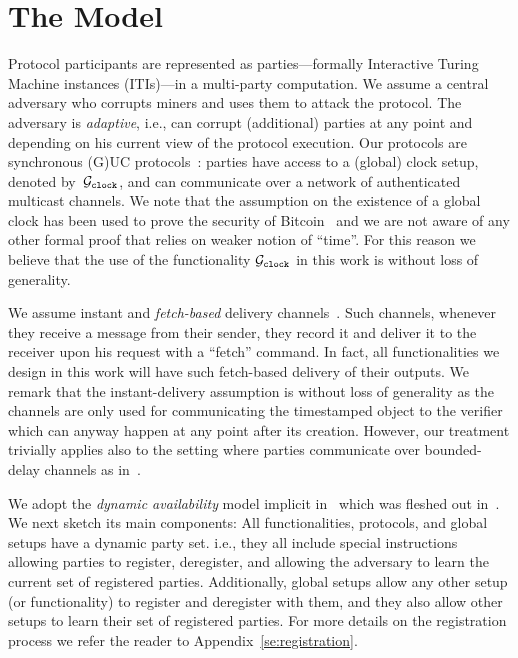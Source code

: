 \section{The Model}

Protocol participants are represented as parties---formally Interactive Turing Machine instances (ITIs)---in a multi-party computation. We assume a central adversary who  corrupts miners and  uses them to attack the protocol. The adversary is {\em adaptive}, i.e., can corrupt (additional) parties  at any point  and depending on his current view of the protocol execution. Our protocols are synchronous (G)UC protocols~\cite{C:BMTZ17,TCC:KMTZ13}:  parties have access to  a (global) clock setup, denoted by~$\mathcal{G}_{\mathtt{clock}}$, and can communicate over a network of authenticated multicast channels. We note that the assumption on the existence of a global clock has been used to prove the security of Bitcoin~\cite{C:BMTZ17} and we are not aware of any other formal proof that relies on weaker notion of ``time''. For this reason we believe that the use of the  functionality $\mathcal{G}_{\mathtt{clock}}$ in this work is without loss of generality. 

We assume instant and {\em fetch-based}  delivery channels~\cite{TCC:KMTZ13,AC:CGHZ16}. Such channels, whenever they receive a message from their sender, they record it and deliver it to the receiver upon his request with a ``fetch'' command. In fact, all functionalities we design in this work will have such  fetch-based delivery of their outputs. We remark that the instant-delivery assumption is without loss of generality as the channels are only used for communicating the timestamped object to the verifier which can anyway happen at any point after its creation. However, our treatment trivially applies also to the setting where parties communicate over  bounded-delay channels as in~\cite{C:BMTZ17}.  


We adopt the {\em dynamic availability} model implicit in~\cite{C:BMTZ17} which was fleshed out in~\cite{CCS:BGKRZ18}. We next sketch its main components: All functionalities, protocols, and global setups have a dynamic party set. i.e., they all include special instructions allowing parties to register,  deregister, and allowing the adversary to learn the current set of registered parties. Additionally,  global setups allow any other setup (or functionality) to register and deregister with them, and they also allow other setups to learn their set of registered parties. For more details on the registration process we refer the reader to Appendix~\ref{se:registration}.  
